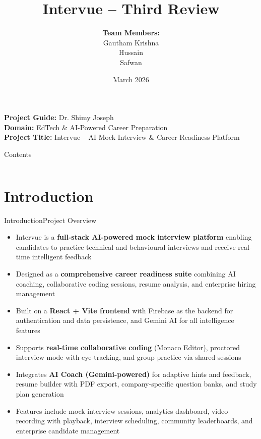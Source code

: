 \documentclass{beamer}
\title[Intervue -- Third Review]{Intervue -- Third Review}
\author[Gautham Krishna, Hussain, Safwan]{
    \textbf{Team Members:}\\
    Gautham Krishna \\
    Hussain \\
    Safwan \\
}
\date{March 2026}
\begin{document}
\begin{frame}
    \titlepage
    \begin{center}
    \small
    \textbf{Project Guide:} Dr. Shimy Joseph\\
    \textbf{Domain:} EdTech \& AI-Powered Career Preparation\\
    \textbf{Project Title:} Intervue -- AI Mock Interview \& Career Readiness Platform
    \end{center}
\end{frame}

\begin{frame}{Contents}
    \scriptsize
    \setlength{\parskip}{3pt}
    \begin{columns}[t]
    \tableofcontents[sections={1-8}]
    \tableofcontents[sections={9-15}]
    \end{columns}
\end{frame}

\section{Introduction}
\begin{frame}{Introduction}{Project Overview}
\begin{itemize}
    \item Intervue is a \textbf{full-stack AI-powered mock interview platform} enabling candidates to practice technical and behavioural interviews and receive real-time intelligent feedback

    \item Designed as a \textbf{comprehensive career readiness suite} combining AI coaching, collaborative coding sessions, resume analysis, and enterprise hiring management

    \item Built on a \textbf{React + Vite frontend} with Firebase as the backend for authentication and data persistence, and Gemini AI for all intelligence features

    \item Supports \textbf{real-time collaborative coding} (Monaco Editor), proctored interview mode with eye-tracking, and group practice via shared sessions

    \item Integrates \textbf{AI Coach (Gemini-powered)} for adaptive hints and feedback, resume builder with PDF export, company-specific question banks, and study plan generation

    \item Features include mock interview sessions, analytics dashboard, video recording with playback, interview scheduling, community leaderboards, and enterprise candidate management
\end{itemize}
\end{frame}
\end{document}
